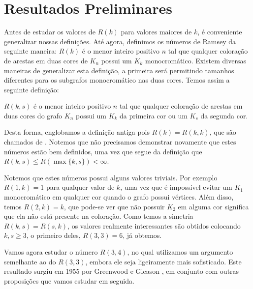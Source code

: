 
\chapter{Resultados Preliminares}

Antes de estudar os valores de $R(k)$ para valores maiores de $k$, é conveniente generalizar nossas definições. Até agora, definimos os números de Ramsey da seguinte maneira: $R(k)$ é o menor inteiro positivo $n$ tal que qualquer coloração de arestas em duas cores de $K_n$ possui um $K_k$ monocromático. Existem diversas maneiras de generalizar esta definição, a primeira será permitindo tamanhos diferentes para os subgrafos monocromático nas duas cores. Temos assim a seguinte definição:

\begin{definition}
$R(k,s)$ é o menor inteiro positivo $n$ tal que qualquer coloração de arestas em duas cores do grafo $K_n$ possui um $K_k$ da primeira cor ou um $K_s$ da segunda cor.
\end{definition}

Desta forma, englobamos a definição antiga pois $R(k) = R(k,k)$, que são chamados de . Notemos que não precisamos demonstrar novamente que estes números estão bem definidos, uma vez que segue da definição que $R(k,s) \leq R(\max\{k,s\}) < \infty$.

Notemos que estes números possui alguns valores triviais. Por exemplo $R(1,k) = 1$ para qualquer valor de $k$, uma vez que é impossível evitar um $K_1$ monocromático em qualquer cor quando o grafo possui vértices. Além disso, temos $R(2,k) = k$, que pode-se ver que não possuir $K_2$ em alguma cor significa que ela não está presente na coloração. Como temos a simetria $R(k,s) = R(s,k)$, os valores realmente interessantes são obtidos colocando $k,s \geq 3$, o primeiro deles, $R(3,3) = 6$, já obtemos.

Vamos agora estudar o número $R(3,4)$, no qual utilizamos um argumento semelhante ao do $R(3,3)$, embora ele seja ligeiramente mais sofisticado. Este resultado surgiu em 1955 por Greenwood e Gleason \cite{greenwood}, em conjunto com outras proposições que vamos estudar em seguida.

